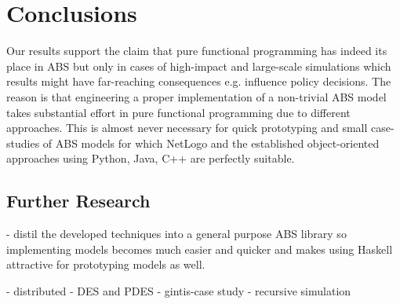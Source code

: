 \section{Conclusions}
\label{sec:conclusions}

Our results support the claim that pure functional programming has indeed its place in ABS but only in cases of high-impact and large-scale simulations which results might have far-reaching consequences e.g. influence policy decisions. The reason is that engineering a proper implementation of a non-trivial ABS model takes substantial effort in pure functional programming due to different approaches. This is almost never necessary for quick prototyping and small case-studies of ABS models for which NetLogo and the established object-oriented approaches using Python, Java, C++ are perfectly suitable.

\subsection{Further Research}
- distil the developed techniques into a general purpose ABS library so implementing models becomes much easier and quicker and makes using Haskell attractive for prototyping models as well.

- distributed
- DES and PDES
- gintis-case study
- recursive simulation